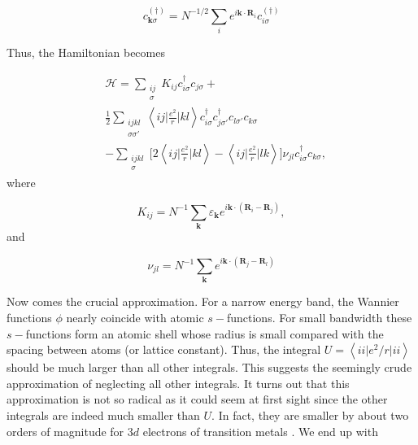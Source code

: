 \documentclass[10pt, twocolumn, twoside]{article}
\begin{document}
\begin{equation}
c_{\bm k \sigma}^{(\dagger)} = N^{-1/2} \sum_i e^{i \bm k \cdot \bm R_i} c_{i\sigma}^{(\dagger)}
\end{equation}

Thus, the Hamiltonian becomes 

\begin{equation}
\begin{split}
&\mathcal{H} = \sum_{\substack{ i j \\ \sigma} } K_{ij} c_{i \sigma}^\dagger c_{j \sigma} + \\
&\frac{1}{2} \sum_{\substack{i j k l \\ \sigma \sigma'} }\left\langle i j \bigg| \frac{e^2}{r} \bigg| k l \right\rangle 
 c_{i \sigma}^\dagger c_{j \sigma'}^\dagger c_{l \sigma'} c_{ k \sigma} \\
 &- \sum_{\substack{ijkl \\ \sigma }} \bigg[ 2 \left\langle i j \bigg| \frac{e^2}{r} \bigg| k l \right\rangle - \left\langle i j \bigg| \frac{e^2}{r} \bigg| l k \right\rangle \bigg] \nu_{j l} c_{i \sigma}^\dagger c_{ k \sigma} ,
\end{split}
\end{equation}
where

\begin{equation}\label{eq:hopping_matrix}
K_{ij} = N^{-1} \sum_{\bm k} \varepsilon_{\bm k} e^{i \bm k \cdot ( \bm R_i - \bm R_j )},
\end{equation}
and

\begin{equation}
\nu_{j l} = N^{-1} \sum_{\bm k} e^{i \bm k \cdot ( \bm R_j - \bm R_l) }
\end{equation}

Now comes the crucial approximation. For a narrow energy band, the Wannier functions $\phi$ nearly coincide with atomic $s-$functions. For small bandwidth these $s-$functions form an atomic shell whose radius is small compared with the spacing between atoms (or lattice constant). Thus, the integral $U = \left\langle i i \big| e^2 / r \big| i i \right\rangle$ should be much larger than all other integrals. This suggests the seemingly crude approximation of neglecting all other integrals. It turns out that this approximation is not so radical as it could seem at first sight since the other integrals are indeed much smaller than $U$. In fact, they are smaller by about two orders of magnitude for $3d$ electrons of transition metals \cite{Hubbard1963}. We end up with
\end{document}
